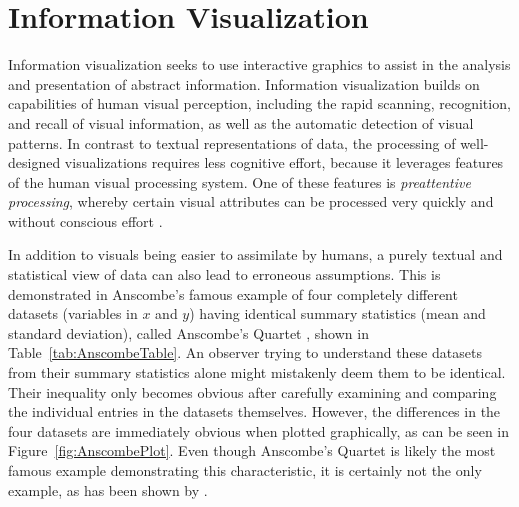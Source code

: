 
\chapter{Information Visualization}
\label{chap:InfoVis}

Information visualization seeks to use interactive graphics to assist
in the analysis and presentation of abstract information. Information
visualization builds on capabilities of human visual perception,
including the rapid scanning, recognition, and recall of visual
information, as well as the automatic detection of visual patterns. In
contrast to textual representations of data, the processing of
well-designed visualizations requires less cognitive effort,
because it leverages features of the human visual processing
system. One of these features is \emph{preattentive processing},
whereby certain visual attributes can be processed very quickly and
without conscious effort \parencite{PreattentiveProcessing}.


In addition to visuals being easier to assimilate by humans, a purely
textual and statistical view of data can also lead to erroneous
assumptions. This is demonstrated in Anscombe's famous example of four
completely different datasets (variables in $x$ and $y$) having
identical summary statistics (mean and standard deviation), called
Anscombe's Quartet \parencite{AnscombesQuartet}, shown in
Table~\ref{tab:AnscombeTable}. An observer trying to understand these
datasets from their summary statistics alone might mistakenly deem
them to be identical. Their inequality only becomes obvious after
carefully examining and comparing the individual entries in the
datasets themselves.
%
However, the differences in the four datasets are immediately obvious
when plotted graphically, as can be seen in
Figure~\ref{fig:AnscombePlot}. Even though Anscombe's Quartet is
likely the most famous example demonstrating this characteristic, it
is certainly not the only example, as has been shown by
\textcite{GenDataIdenticalStatisticsDissimilarGraphics}.



